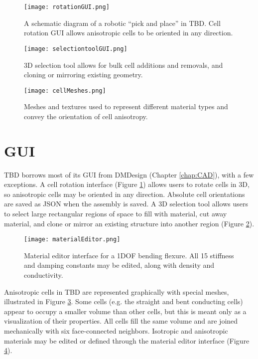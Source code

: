 {\begin{figure}
  \texttt{[image: rotationGUI.png]}
  \caption{A schematic diagram of a robotic ``pick and place'' in TBD.  Cell rotation GUI allows anisotropic cells to be oriented in any direction.}
  \label{fig:rotationGUI}
\end{figure}

\begin{figure}
  \texttt{[image: selectiontoolGUI.png]}
  \caption{3D selection tool allows for bulk cell additions and removals, and cloning or mirroring existing geometry.}
  \label{fig:selectiontoolGUI}
\end{figure}

\begin{figure}
  \texttt{[image: cellMeshes.png]}
  \caption{Meshes and textures used to represent different material types and convey the orientation of cell anisotropy.}
  \label{fig:cellMeshes}
\end{figure}

\section{GUI}

TBD borrows most of its GUI from DMDesign (Chapter \ref{chap:CAD}), with a few exceptions.  A cell rotation interface (Figure \ref{fig:rotationGUI}) allows users to rotate cells in 3D, so anisotropic cells may be oriented in any direction.  Absolute cell orientations are saved as JSON when the assembly is saved.  A 3D selection tool allows users to select large rectangular regions of space to fill with material, cut away material, and clone or mirror an existing structure into another region (Figure \ref{fig:selectiontoolGUI}).\\

\begin{figure}
  \texttt{[image: materialEditor.png]}
  \caption{Material editor interface for a 1DOF bending flexure.  All 15 stiffness and damping constants may be edited, along with density and conductivity.}
  \label{fig:materialEditor}
\end{figure}

Anisotropic cells in TBD are represented graphically with special meshes, illustrated in Figure \ref{fig:cellMeshes}.  Some cells (e.g. the straight and bent conducting cells) appear to occupy a smaller volume than other cells, but this is meant only as a visualization of their properties.  All cells fill the same volume and are joined mechanically with six face-connected neighbors.  Isotropic and anisotropic materials may be edited or defined through the material editor interface (Figure \ref{fig:materialEditor}).\\

}
